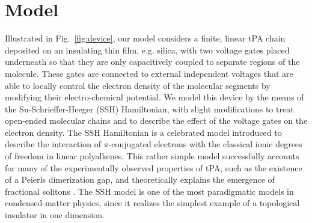 \documentclass[10pt,a4paper]{article}
\begin{document}
\section{Model}\label{sec:model}

Illustrated in Fig.~\ref{fig:device}, our model considers a finite, linear tPA chain deposited on an insulating thin film, e.g. silica, with two voltage gates placed underneath so that they are only capacitively coupled to separate regions of the molecule. These gates are connected to external independent voltages that are able to locally control the electron density of the molecular segments by modifying their electro-chemical potential. We model this device by the means of the Su-Schrieffer-Heeger (SSH) Hamiltonian\cite{Heeger88_Solitons_in_conducting_polymers, Su79_Solitons_in_polyacetylene}, with slight modifications to treat open-ended molecular chains\cite{Vos96_SSH_model_finite_length} and to describe the effect of the voltage gates on the electron density. The SSH Hamiltonian is a celebrated model introduced to describe the interaction of $\pi$-conjugated electrons with the classical ionic degrees of freedom in linear polyalkenes. This rather simple model successfully accounts for many of the experimentally observed properties of tPA, such as the existence of a Peierls dimerization gap, and theoretically explains the emergence of fractional solitons \cite{Farchioni_Grosso_Organic_electronic_metals_book, Heeger88_Solitons_in_conducting_polymers}. The SSH model is one of the most paradigmatic models in condensed-matter physics, since it realizes the simplest example of a topological insulator in one dimension\cite{Bernevig_book_TI_TSC, Asboth16_Short_course_on_TIs}. 
\end{document}
